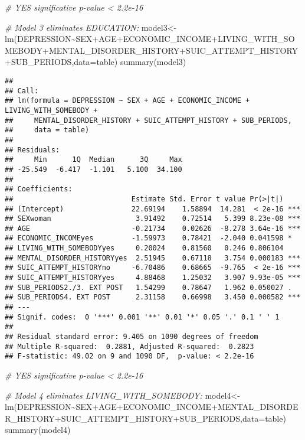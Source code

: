 \documentclass[
]{book}
\newenvironment{Shaded}{\begin{snugshade}}{\end{snugshade}}
\newcommand{\AttributeTok}[1]{\textcolor[rgb]{0.77,0.63,0.00}{#1}}
\newcommand{\CommentTok}[1]{\textcolor[rgb]{0.56,0.35,0.01}{\textit{#1}}}
\newcommand{\FunctionTok}[1]{\textcolor[rgb]{0.00,0.00,0.00}{#1}}
\newcommand{\NormalTok}[1]{#1}
\newcommand{\OtherTok}[1]{\textcolor[rgb]{0.56,0.35,0.01}{#1}}
\newcommand{\SpecialCharTok}[1]{\textcolor[rgb]{0.00,0.00,0.00}{#1}}
\begin{document}
\begin{Shaded}
\begin{Highlighting}[]
\CommentTok{\# YES significative p{-}value \textless{} 2.2e{-}16}

\CommentTok{\# Model 3 eliminates EDUCATION:}
\NormalTok{model3}\OtherTok{\textless{}{-}}\FunctionTok{lm}\NormalTok{(DEPRESSION}\SpecialCharTok{\textasciitilde{}}\NormalTok{SEX}\SpecialCharTok{+}\NormalTok{AGE}\SpecialCharTok{+}\NormalTok{ECONOMIC\_INCOME}\SpecialCharTok{+}\NormalTok{LIVING\_WITH\_SOMEBODY}\SpecialCharTok{+}\NormalTok{MENTAL\_DISORDER\_HISTORY}\SpecialCharTok{+}\NormalTok{SUIC\_ATTEMPT\_HISTORY}\SpecialCharTok{+}\NormalTok{SUB\_PERIODS,}\AttributeTok{data=}\NormalTok{table)}
\FunctionTok{summary}\NormalTok{(model3)}
\end{Highlighting}
\end{Shaded}

\begin{verbatim}
## 
## Call:
## lm(formula = DEPRESSION ~ SEX + AGE + ECONOMIC_INCOME + LIVING_WITH_SOMEBODY + 
##     MENTAL_DISORDER_HISTORY + SUIC_ATTEMPT_HISTORY + SUB_PERIODS, 
##     data = table)
## 
## Residuals:
##     Min      1Q  Median      3Q     Max 
## -25.549  -6.417  -1.101   5.100  34.100 
## 
## Coefficients:
##                            Estimate Std. Error t value Pr(>|t|)    
## (Intercept)                22.69194    1.58894  14.281  < 2e-16 ***
## SEXwoman                    3.91492    0.72514   5.399 8.23e-08 ***
## AGE                        -0.21734    0.02626  -8.278 3.64e-16 ***
## ECONOMIC_INCOMEyes         -1.59973    0.78421  -2.040 0.041598 *  
## LIVING_WITH_SOMEBODYyes     0.20024    0.81560   0.246 0.806104    
## MENTAL_DISORDER_HISTORYyes  2.51945    0.67118   3.754 0.000183 ***
## SUIC_ATTEMPT_HISTORYno     -6.70486    0.68665  -9.765  < 2e-16 ***
## SUIC_ATTEMPT_HISTORYyes     4.88468    1.25032   3.907 9.93e-05 ***
## SUB_PERIODS2./3. EXT POST   1.54299    0.78647   1.962 0.050027 .  
## SUB_PERIODS4. EXT POST      2.31158    0.66998   3.450 0.000582 ***
## ---
## Signif. codes:  0 '***' 0.001 '**' 0.01 '*' 0.05 '.' 0.1 ' ' 1
## 
## Residual standard error: 9.405 on 1090 degrees of freedom
## Multiple R-squared:  0.2881, Adjusted R-squared:  0.2823 
## F-statistic: 49.02 on 9 and 1090 DF,  p-value: < 2.2e-16
\end{verbatim}

\begin{Shaded}
\begin{Highlighting}[]
\CommentTok{\# YES significative p{-}value \textless{} 2.2e{-}16}

\CommentTok{\# Model 4 eliminates LIVING\_WITH\_SOMEBODY:}
\NormalTok{model4}\OtherTok{\textless{}{-}}\FunctionTok{lm}\NormalTok{(DEPRESSION}\SpecialCharTok{\textasciitilde{}}\NormalTok{SEX}\SpecialCharTok{+}\NormalTok{AGE}\SpecialCharTok{+}\NormalTok{ECONOMIC\_INCOME}\SpecialCharTok{+}\NormalTok{MENTAL\_DISORDER\_HISTORY}\SpecialCharTok{+}\NormalTok{SUIC\_ATTEMPT\_HISTORY}\SpecialCharTok{+}\NormalTok{SUB\_PERIODS,}\AttributeTok{data=}\NormalTok{table)}
\FunctionTok{summary}\NormalTok{(model4)}
\end{Highlighting}
\end{Shaded}
\end{document}
